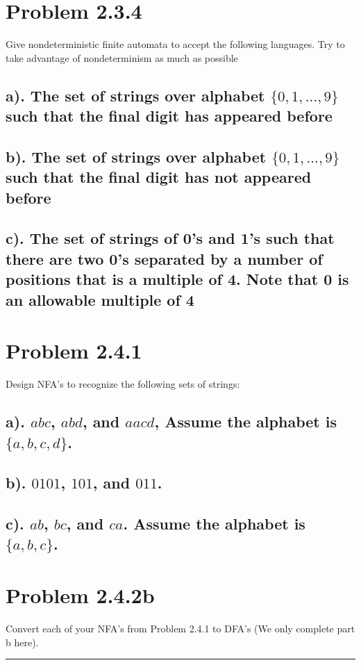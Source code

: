 \documentclass[20pt]{article} %
\begin{document}
\newpage
\section{Problem 2.3.4} 
Give nondeterministic finite automata to accept the following languages. Try to take advantage of nondeterminism as much as possible
\subsection{a). The set of strings over alphabet $\{0,1,...,9\}$ such that the final digit has appeared before}

\subsection{b). The set of strings over alphabet $\{0,1,...,9\}$ such that the final digit has not appeared before}

\subsection{c). The set of strings of 0's and 1's such that there are two 0's separated by a number of positions that is a multiple of 4. Note that 0 is an allowable multiple of 4}



\section{Problem 2.4.1}
Design NFA's to recognize the following sets of strings:

\subsection{a). $abc$, $abd$, and $aacd$, Assume the alphabet is $\{a,b,c,d\}$.}

\subsection{b). $0101$, $101$, and $011$.}

\subsection{c). $ab$, $bc$, and $ca$. Assume the alphabet is $\{a,b,c\}$. }

\section{Problem 2.4.2b}
Convert each of your NFA's from Problem 2.4.1 to DFA's (We only complete part b here).
\noindent\rule{2cm}{0.4pt} \\
\end{document}
